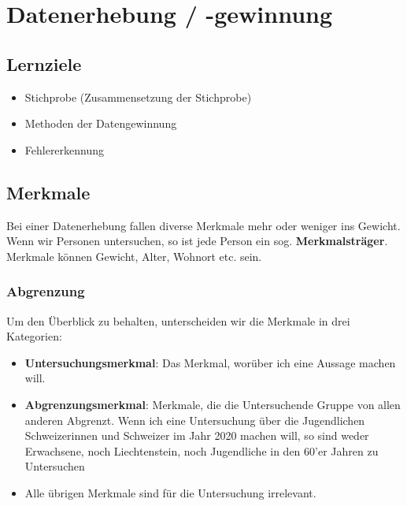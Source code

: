 \section{Datenerhebung / -gewinnung}

\subsection*{Lernziele}

\begin{itemize}
\item Stichprobe (Zusammensetzung der Stichprobe)
\item Methoden der Datengewinnung
\item Fehlererkennung
\end{itemize}



\subsection{Merkmale}
Bei einer Datenerhebung fallen diverse Merkmale mehr oder weniger ins
Gewicht. Wenn wir Personen untersuchen, so ist jede Person ein
sog. \textbf{Merkmalsträger}. Merkmale können Gewicht, Alter, Wohnort
etc. sein.

\subsubsection{Abgrenzung}
Um den Überblick zu behalten, unterscheiden wir die Merkmale in drei
Kategorien:
\begin{itemize}
\item \textbf{Untersuchungsmerkmal}: Das
Merkmal, worüber ich eine Aussage machen will.
\item \textbf{Abgrenzungsmerkmal}: Merkmale,
die die Untersuchende Gruppe von allen anderen Abgrenzt. Wenn ich eine
Untersuchung über die Jugendlichen Schweizerinnen und Schweizer im
Jahr 2020 machen will, so sind weder Erwachsene, noch Liechtenstein,
noch Jugendliche in den 60'er Jahren zu Untersuchen
\item Alle übrigen Merkmale sind für die Untersuchung irrelevant.
\end{itemize}

